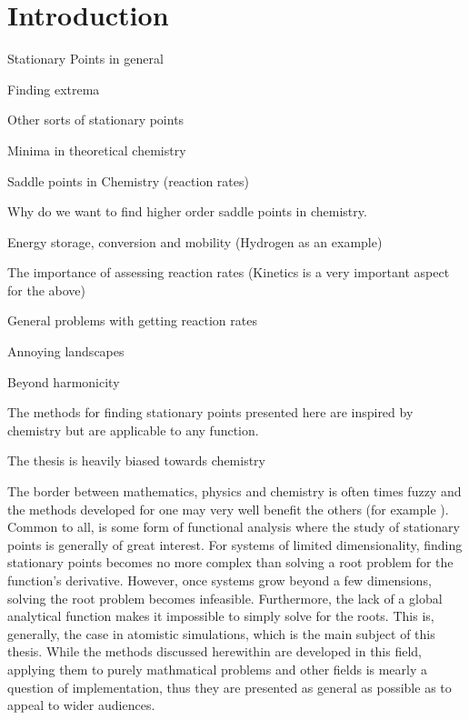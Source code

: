 \chapter{Introduction}
\label{chap:introduction}

\bit
\item Stationary Points in general
\item Finding extrema
\item Other sorts of stationary points
\item Minima in theoretical chemistry
\item Saddle points in Chemistry (reaction rates)
\item Why do we want to find higher order saddle points in chemistry.
\item Energy storage, conversion and mobility (Hydrogen as an example)
\item The importance of assessing reaction rates (Kinetics is a very important aspect for the above)
\item General problems with getting reaction rates
\item Annoying landscapes
\item Beyond harmonicity
\item The methods for finding stationary points presented here are inspired by chemistry but are applicable to any function.
\item The thesis is heavily biased towards chemistry
\eit


The border between mathematics, physics and chemistry is often times fuzzy and the methods developed for one may very well benefit the others (for example \expand \citemiss).
Common to all, is some form of functional analysis where the study of stationary points is generally of great interest.
For systems of limited dimensionality, finding stationary points becomes no more complex than solving a root problem for the function's derivative.
However, once systems grow beyond a few dimensions, solving the root problem becomes infeasible.
Furthermore, the lack of a global analytical function makes it impossible to simply solve for the roots.
This is, generally, the case in atomistic simulations, which is the main subject of this thesis.
While the methods discussed herewithin are developed in this field, applying them to purely mathmatical problems and other fields is mearly a question of implementation, thus they are presented as general as possible as to appeal to wider audiences.

